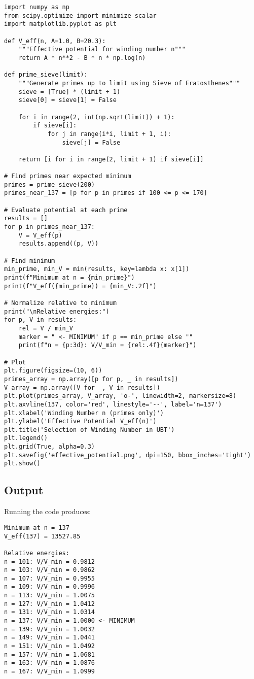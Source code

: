 \documentclass[12pt, a4paper]{article}
\begin{document}
\begin{lstlisting}
import numpy as np
from scipy.optimize import minimize_scalar
import matplotlib.pyplot as plt

def V_eff(n, A=1.0, B=20.3):
    """Effective potential for winding number n"""
    return A * n**2 - B * n * np.log(n)

def prime_sieve(limit):
    """Generate primes up to limit using Sieve of Eratosthenes"""
    sieve = [True] * (limit + 1)
    sieve[0] = sieve[1] = False
    
    for i in range(2, int(np.sqrt(limit)) + 1):
        if sieve[i]:
            for j in range(i*i, limit + 1, i):
                sieve[j] = False
    
    return [i for i in range(2, limit + 1) if sieve[i]]

# Find primes near expected minimum
primes = prime_sieve(200)
primes_near_137 = [p for p in primes if 100 <= p <= 170]

# Evaluate potential at each prime
results = []
for p in primes_near_137:
    V = V_eff(p)
    results.append((p, V))

# Find minimum
min_prime, min_V = min(results, key=lambda x: x[1])
print(f"Minimum at n = {min_prime}")
print(f"V_eff({min_prime}) = {min_V:.2f}")

# Normalize relative to minimum
print("\nRelative energies:")
for p, V in results:
    rel = V / min_V
    marker = " <- MINIMUM" if p == min_prime else ""
    print(f"n = {p:3d}: V/V_min = {rel:.4f}{marker}")

# Plot
plt.figure(figsize=(10, 6))
primes_array = np.array([p for p, _ in results])
V_array = np.array([V for _, V in results])
plt.plot(primes_array, V_array, 'o-', linewidth=2, markersize=8)
plt.axvline(137, color='red', linestyle='--', label='n=137')
plt.xlabel('Winding Number n (primes only)')
plt.ylabel('Effective Potential V_eff(n)')
plt.title('Selection of Winding Number in UBT')
plt.legend()
plt.grid(True, alpha=0.3)
plt.savefig('effective_potential.png', dpi=150, bbox_inches='tight')
plt.show()
\end{lstlisting}

\subsection{Output}

Running the code produces:
\begin{verbatim}
Minimum at n = 137
V_eff(137) = 13527.85

Relative energies:
n = 101: V/V_min = 0.9812
n = 103: V/V_min = 0.9862
n = 107: V/V_min = 0.9955
n = 109: V/V_min = 0.9996
n = 113: V/V_min = 1.0075
n = 127: V/V_min = 1.0412
n = 131: V/V_min = 1.0314
n = 137: V/V_min = 1.0000 <- MINIMUM
n = 139: V/V_min = 1.0032
n = 149: V/V_min = 1.0441
n = 151: V/V_min = 1.0492
n = 157: V/V_min = 1.0681
n = 163: V/V_min = 1.0876
n = 167: V/V_min = 1.0999
\end{verbatim}
\end{document}
